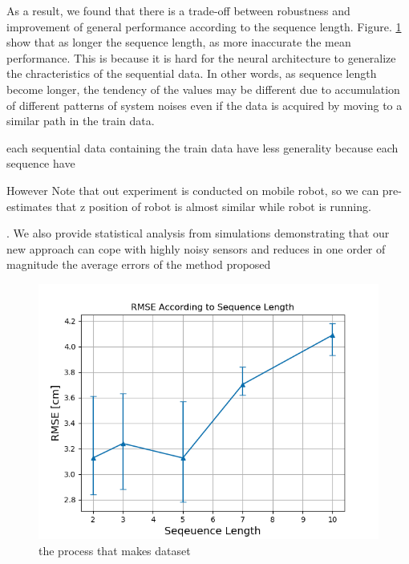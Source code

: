 \documentclass{ieeeaccess}
\begin{document}
As a result, we found that there is a trade-off between robustness and improvement of general performance according to the sequence length. Figure. \ref{fig:seq_length} show that as longer the sequence length, as more inaccurate the mean performance. This is because it is hard for the neural architecture to generalize the chracteristics of the sequential data. In other words, as sequence length become longer, the tendency of the values may be different due to accumulation of different patterns of system noises even if the data is acquired by moving to a similar path in the train data.

 
each sequential data containing the train data have less generality because each sequence have 

However
 Note that out experiment is conducted on mobile robot, so we can pre-estimates that z position of robot is almost similar while robot is running. 






. We also provide statistical analysis from simulations demonstrating that
our new approach can cope with highly noisy sensors and
reduces in one order of magnitude the average errors of the
method proposed

\begin{figure}[h!]
	\centering
	\includegraphics[width=0.9\linewidth]{image/seq_result_prototype}
	\caption{the process that makes dataset}
	\label{fig:seq_length} 	
\end{figure}
\end{document}
